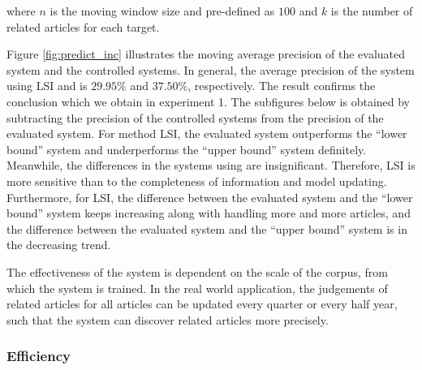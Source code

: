 where $n$ is the moving window size and pre-defined as $100$ and $k$ is the number of related articles for each target. 

Figure \ref{fig:predict_inc} illustrates the moving average precision of the evaluated system and the controlled systems. In general, the average precision of the system using LSI and \tfidf{} is $29.95\%$ and $37.50\%$, respectively. The result confirms the conclusion which we obtain in experiment 1. The subfigures below is obtained by subtracting the precision of the controlled systems from the precision of the evaluated system. For method LSI, the evaluated system outperforms the ``lower bound'' system and underperforms the ``upper bound'' system definitely. Meanwhile, the differences in the systems using \tfidf{} are insignificant. Therefore, LSI is more sensitive than \tfidf{} to the completeness of information and model updating. Furthermore, for LSI, the difference between the evaluated system and the ``lower bound'' system keeps increasing along with handling more and more articles, and the difference between the evaluated system and the ``upper bound'' system is in the decreasing trend. 

The effectiveness of the system is dependent on the scale of the corpus, from which the system is trained. In the real world application, the judgements of related articles for all articles can be updated every quarter or every half year, such that the system can discover related articles more precisely. 


\subsubsection{Efficiency}

